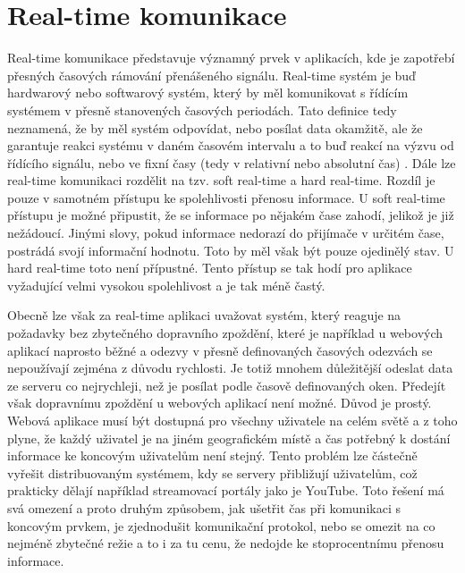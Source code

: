 \chapter{Real-time komunikace}
Real-time komunikace představuje významný prvek v aplikacích, kde je zapotřebí přesných časových rámování přenášeného signálu. Real-time systém je buď hardwarový nebo softwarový systém, který by měl komunikovat s řídícím systémem v přesně stanovených časových periodách. Tato definice tedy neznamená, že by měl systém odpovídat, nebo posílat data okamžitě, ale že garantuje reakci systému v daném časovém intervalu a to buď reakcí na výzvu od řídícího signálu, nebo ve fixní časy (tedy v relativní nebo absolutní čas) \cite{real-time}. Dále lze real-time komunikaci rozdělit na tzv. soft real-time a hard real-time. Rozdíl je pouze v samotném přístupu ke spolehlivosti přenosu informace. U soft real-time přístupu je možné připustit, že se informace po nějakém čase zahodí, jelikož je již nežádoucí. Jinými slovy, pokud informace nedorazí do přijímače v určitém čase, postrádá svojí informační hodnotu. Toto by měl však být pouze ojedinělý stav. U hard real-time toto není přípustné. Tento přístup se tak hodí pro aplikace vyžadující velmi vysokou spolehlivost a je tak méně častý.

Obecně lze však za real-time aplikaci uvažovat systém, který reaguje na požadavky bez zbytečného dopravního zpoždění, které je například u webových aplikací naprosto běžné a odezvy v přesně definovaných časových odezvách se nepoužívají zejména z důvodu rychlosti. Je totiž mnohem dů\-le\-ži\-těj\-ší odeslat data ze serveru co nejrychleji, než je posílat podle časově definovaných oken. Předejít však dopravnímu zpoždění u webových aplikací není možné. Důvod je prostý. Webová aplikace musí být dostupná pro všechny uživatele na celém světě a z toho plyne, že každý uživatel je na jiném geografickém místě a čas potřebný k dostání informace ke koncovým uživatelům není stejný. Tento problém lze částečně vyřešit distribuovaným systémem, kdy se servery přibližují uživatelům, což prakticky dělají například streamovací portály jako je YouTube. Toto řešení má svá omezení a proto druhým způsobem, jak ušetřit čas při komunikaci s koncovým prvkem, je zjednodušit komunikační protokol, nebo se omezit na co nejméně zbytečné režie a to i za tu cenu, že nedojde ke stoprocentnímu přenosu informace.

